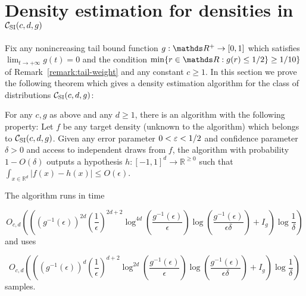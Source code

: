
\section{Density estimation for densities in ${\mathcal C}_{\mathrm{SI}}(c,d,g)$}
\label{sec:no-noise}

Fix any nonincreasing tail bound function $g: \R^+ \to [0,1]$ which satisfies $\lim_{t \to +\infty} g(t) = 0$
and the condition $\min\{r \in \R: g(r) \leq 1/2\}\geq 1/10\}$ of Remark~\ref{remark:tail-weight}
and any constant $c \geq 1$.
In this section we prove the following theorem which gives a density estimation algorithm for the class of distributions
${\mathcal C}_{\mathrm{SI}}(c,d,g)$:
\begin{theorem} \label{thm:no-noise}
For any $c,g$ as above and any $d \geq 1$,  there is an algorithm with the following property:  Let $f$ be any target density 
(unknown to the algorithm) which belongs to ${\mathcal C}_{\mathrm{SI}}(c,d,g)$. 
Given any error parameter $0 < \varepsilon < 1/2$ and confidence parameter $\delta > 0$ and access to independent draws from $f$, the algorithm with probability $1-O(\delta)$ outputs a hypothesis  $h:[-1,1]^d \rightarrow \mathbb{R}^{\geq 0}$ such that $\int_{x \in \mathbb{R}^d} |f(x) - h(x)| \le O(\epsilon)$. 

The algorithm runs in time 

\[
O_{c,d}\left(
  \left(
   (g^{-1}(\epsilon))^{2d}
          \left( \frac{1}{\epsilon} \right)^{2 d + 2}
          \log^{4 d} \left( \frac{g^{-1}(\epsilon)}{\epsilon} \right)
          \log \left( \frac{g^{-1}(\epsilon)}{\epsilon \delta} \right) 
  + I_g \right) \log \frac{1}{\delta}
\right)
\] 
and uses 

\[
O_{c,d}\left(
 \left(
 (g^{-1}(\epsilon))^{d}
          \left( \frac{1}{\epsilon} \right)^{d+2}
          \log^{2d} \left( \frac{g^{-1}(\epsilon)}{\epsilon} \right)
          \log \left( \frac{g^{-1}(\epsilon)}{\epsilon \delta} \right)
 + I_g \right) \log \frac{1}{\delta}
 \right)
\] samples.  
\end{theorem}

